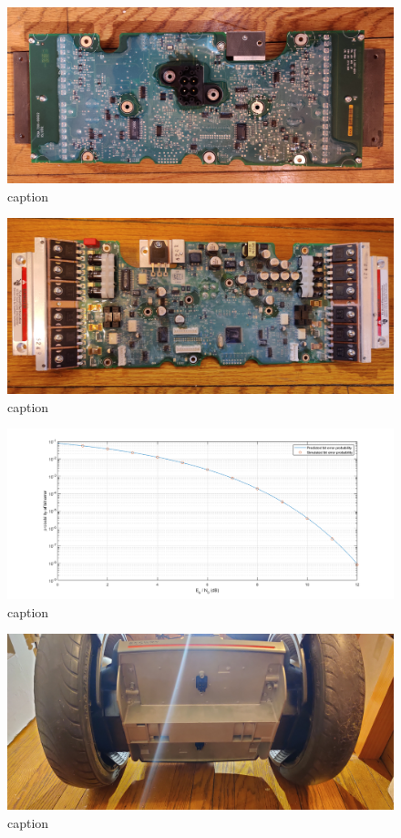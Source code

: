 \documentclass[]{formalLabReport}
\begin{document}
\begin{figure}
    \includegraphics[]{entireBoardBottom.jpg}
    \caption{caption}
    \label{fig:entireBoardBottom.jpg}
\end{figure}

\begin{figure}
    \includegraphics[]{entireBoardTop.jpg}
    \caption{caption}
    \label{fig:entireBoardTop.jpg}
\end{figure}

\begin{figure}
    \includegraphics[]{report.png}
    \caption{caption}
    \label{fig:report.png}
\end{figure}

\begin{figure}
    \includegraphics[]{segwayBottom.jpg}
    \caption{caption}
    \label{fig:segwayBottom.jpg}
\end{figure}
\end{document}
